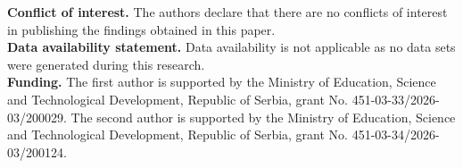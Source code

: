 \documentclass{article}
\theoremstyle{definition}\newtheorem{example}{Example}[section]
\begin{document}
	\noindent\textbf{Conflict of interest.} The authors declare that there are no conflicts of interest in publishing the findings obtained in this paper.\\
	
	\noindent\textbf{Data availability statement.} Data availability is not applicable as no data sets were generated during this research.\\
	
	\noindent\textbf{Funding.} The first author is supported by the Ministry of Education, Science and Technological Development, Republic of Serbia, grant No. 451-03-33/2026-03/200029. The second author is supported by the Ministry of Education, Science and Technological Development, Republic of Serbia, grant No. 451-03-34/2026-03/200124.
	
	
	
	
	
\end{document}
